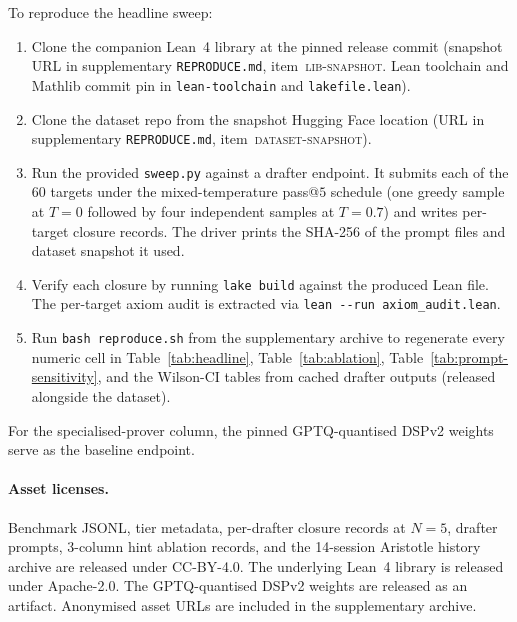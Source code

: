 To reproduce the headline sweep:
\begin{enumerate}[leftmargin=1.3em, itemsep=0.15em]
\item Clone the companion Lean~4 library at the pinned release
commit (snapshot URL in supplementary
\texttt{REPRODUCE.md}, item~\textsc{lib-snapshot}. Lean
toolchain and Mathlib commit pin in \texttt{lean-toolchain}
and \texttt{lakefile.lean}).
\item Clone the dataset repo from the snapshot Hugging Face
location (URL in supplementary \texttt{REPRODUCE.md},
item~\textsc{dataset-snapshot}).
\item Run the provided \texttt{sweep.py} against a drafter
endpoint. It submits each of the $60$ targets under
the mixed-temperature pass@$5$ schedule (one greedy sample at
$T=0$ followed by four independent samples at $T=0.7$) and
writes per-target closure records. The driver prints the
SHA-256 of the prompt files and dataset snapshot it used.
\item Verify each closure by running \texttt{lake build}
against the produced Lean file. The per-target axiom audit is
extracted via \texttt{lean -{}-run axiom\_audit.lean}.
\item Run \texttt{bash reproduce.sh} from the supplementary
archive to regenerate every numeric cell in
Table~\ref{tab:headline}, Table~\ref{tab:ablation},
Table~\ref{tab:prompt-sensitivity}, and the Wilson-CI tables
from cached drafter outputs (released alongside the dataset).
\end{enumerate}
For the specialised-prover column, the pinned GPTQ-quantised
DSPv2 weights serve as the baseline endpoint.

\paragraph{Asset licenses.}
Benchmark JSONL, tier metadata, per-drafter closure records at
$N=5$, drafter prompts, 3-column hint ablation records, and the
14-session Aristotle history archive are released under CC-BY-4.0.
The underlying Lean~4 library is released under Apache-2.0. The
GPTQ-quantised DSPv2 weights are released as an artifact. Anonymised
asset URLs are included in the supplementary archive.


